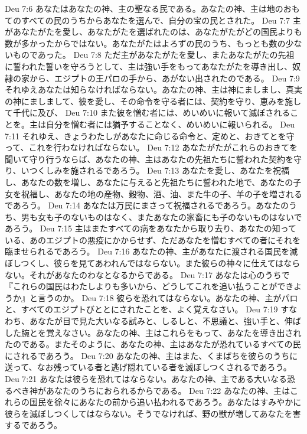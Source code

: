 Deu 7:6  あなたはあなたの神、主の聖なる民である。あなたの神、主は地のおもてのすべての民のうちからあなたを選んで、自分の宝の民とされた。
Deu 7:7  主があなたがたを愛し、あなたがたを選ばれたのは、あなたがたがどの国民よりも数が多かったからではない。あなたがたはよろずの民のうち、もっとも数の少ないものであった。
Deu 7:8  ただ主があなたがたを愛し、またあなたがたの先祖に誓われた誓いを守ろうとして、主は強い手をもってあなたがたを導き出し、奴隷の家から、エジプトの王パロの手から、あがない出されたのである。
Deu 7:9  それゆえあなたは知らなければならない。あなたの神、主は神にましまし、真実の神にましまして、彼を愛し、その命令を守る者には、契約を守り、恵みを施して千代に及び、
Deu 7:10  また彼を憎む者には、めいめいに報いて滅ぼされることを。主は自分を憎む者には猶予することなく、めいめいに報いられる。
Deu 7:11  それゆえ、きょうわたしがあなたに命じる命令と、定めと、おきてとを守って、これを行わなければならない。
Deu 7:12  あなたがたがこれらのおきてを聞いて守り行うならば、あなたの神、主はあなたの先祖たちに誓われた契約を守り、いつくしみを施されるであろう。
Deu 7:13  あなたを愛し、あなたを祝福し、あなたの数を増し、あなたに与えると先祖たちに誓われた地で、あなたの子女を祝福し、あなたの地の産物、穀物、酒、油、また牛の子、羊の子を増されるであろう。
Deu 7:14  あなたは万民にまさって祝福されるであろう。あなたのうち、男も女も子のないものはなく、またあなたの家畜にも子のないものはないであろう。
Deu 7:15  主はまたすべての病をあなたから取り去り、あなたの知っている、あのエジプトの悪疫にかからせず、ただあなたを憎むすべての者にそれを臨ませられるであろう。
Deu 7:16  あなたの神、主があなたに渡される国民を滅ぼしつくし、彼らを見てあわれんではならない。また彼らの神々に仕えてはならない。それがあなたのわなとなるからである。
Deu 7:17  あなたは心のうちで『これらの国民はわたしよりも多いから、どうしてこれを追い払うことができようか』と言うのか。
Deu 7:18  彼らを恐れてはならない。あなたの神、主がパロと、すべてのエジプトびととにされたことを、よく覚えなさい。
Deu 7:19  すなわち、あなたが目で見た大いなる試みと、しるしと、不思議と、強い手と、伸ばした腕とを覚えなさい。あなたの神、主はこれらをもって、あなたを導き出されたのである。またそのように、あなたの神、主はあなたが恐れているすべての民にされるであろう。
Deu 7:20  あなたの神、主はまた、くまばちを彼らのうちに送って、なお残っている者と逃げ隠れている者を滅ぼしつくされるであろう。
Deu 7:21  あなたは彼らを恐れてはならない。あなたの神、主である大いなる恐るべき神があなたのうちにおられるからである。
Deu 7:22  あなたの神、主はこれらの国民を徐々にあなたの前から追い払われるであろう。あなたはすみやかに彼らを滅ぼしつくしてはならない。そうでなければ、野の獣が増してあなたを害するであろう。
